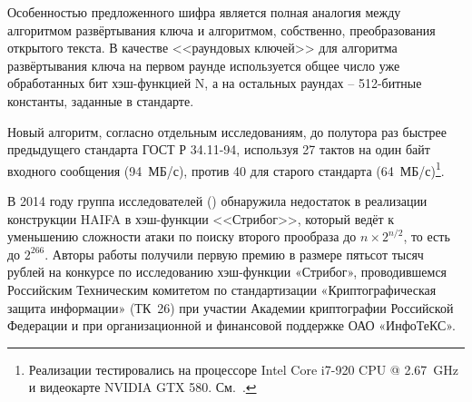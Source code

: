 Особенностью предложенного шифра является полная аналогия между алгоритмом развёртывания ключа и алгоритмом, собственно, преобразования открытого текста. В качестве <<раундовых ключей>> для алгоритма развёртывания ключа на первом раунде используется общее число уже обработанных бит хэш-функцией N, а на остальных раундах -- 512-битные константы, заданные в стандарте.

Новый алгоритм, согласно отдельным исследованиям, до полутора раз быстрее предыдущего стандарта ГОСТ Р 34.11-94, используя 27 тактов на один байт входного сообщения (94~МБ/с), против 40 для старого стандарта (64~МБ/с)\footnote{Реализации тестировались на процессоре Intel Core i7-920 CPU @ 2.67~GHz и видеокарте NVIDIA GTX 580. См.~\cite{Lebedev:2013}.}.

В 2014 году группа исследователей (\cite{Guo:Jean:Leurent:Peyrin:Wang:2014}) обнаружила недостаток в реализации конструкции HAIFA в хэш-функции <<Стрибог>>, который ведёт к уменьшению сложности атаки по поиску второго прообраза до $n \times 2^{n/2}$, то есть до $2^{266}$. Авторы работы получили первую премию в размере пятьсот тысяч рублей на конкурсе по исследованию хэш-функции «Стрибог», проводившемся Российским Техническим комитетом по стандартизации «Криптографическая защита информации» (ТК~26) при участии Академии криптографии Российской Федерации и при организационной и финансовой поддержке ОАО «ИнфоТеКС».


